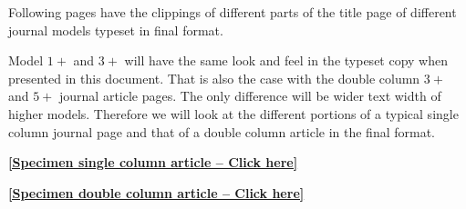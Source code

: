 \documentclass[a4paper,12pt]{article}
\begin{document}
Following pages have the clippings of different parts of
the title page of different journal models typeset in final
format.

Model $1+$ and $3+$  will have the same look and
feel in the typeset copy when presented in this document. That is
also the case with the double column $3+$ and $5+$ journal article
pages. The only difference will be wider text width of
higher models.  Therefore we will look at the
different portions of a typical single column journal page and
that of a double column article in the final format.

\vspace*{2pc}

\begin{center}
\hypertarget{bsc}{}
\hyperlink{sc}{
{\bf [Specimen single column article -- Click here]}
}

\vspace*{2pc}

\hypertarget{bsc}{}
\hyperlink{dc}{
{\bf [Specimen double column article -- Click here]}
}
\end{center}

\newpage
\vspace*{-2pc}
\src{}\hypertarget{sc}{}
\def\rulecolor{blue!70}
\hyperlink{bsc}{}
\def\rulecolor{orange}


\newpage

\src{}\hypertarget{dc}{}
\def\rulecolor{blue!70}
\hyperlink{bsc}{}
\def\rulecolor{orange}
\end{document}
